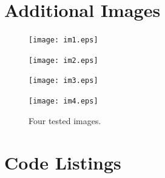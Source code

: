 \documentclass[12pt]{article}
\begin{document}
\section{Additional Images}
\begin{figure}[h]
	\centering %
	\captionsetup{justification=centering}
	\begin{minipage}{0.5\textwidth}
		\centering %
		\texttt{[image: im1.eps]}
		\label{im1} 
	\end{minipage}\hfill
	\begin{minipage}{0.5\textwidth}
		\centering %
		\texttt{[image: im2.eps]}

	\end{minipage}
\end{figure}
\begin{figure}[h]
	\centering %
	\captionsetup{justification=centering}
	\begin{minipage}{0.5\textwidth}
		\centering %
		\texttt{[image: im3.eps]}
		 
	\end{minipage}\hfill
	\begin{minipage}{0.5\textwidth}
		\centering %
		\texttt{[image: im4.eps]}
		
	\end{minipage}
	\caption{Four tested images.}
\end{figure}

\newpage
\section{Code Listings}\label{code}


 




%
%
%
\end{document}
